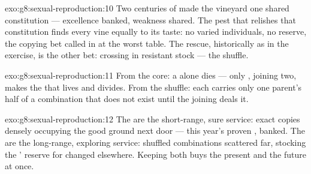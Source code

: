 \begin{solution}{exo:g8:sexual-reproduction:10}
Two centuries of  made the vineyard one shared
constitution --- excellence banked, weakness shared. The
pest that relishes that constitution finds every vine
equally to its taste: no varied individuals, no reserve,
the copying bet called in at the worst table. The rescue,
historically as in the exercise, is the other bet:
crossing in resistant stock --- the shuffle.
\end{solution}

\begin{solution}{exo:g8:sexual-reproduction:11}
From the core: a  alone dies --- only ,
joining two, makes the  that lives and divides. From
the shuffle: each  carries only one parent's half of
a combination that does not exist until the joining deals
it.
\end{solution}

\begin{solution}{exo:g8:sexual-reproduction:12}
The  are the short-range, sure service: exact
copies densely occupying the good ground next door ---
this year's proven , banked. The  are the
long-range, exploring service: shuffled combinations
scattered far, stocking the ' reserve for changed
 elsewhere. Keeping both buys the present and
the future at once.
\end{solution}

